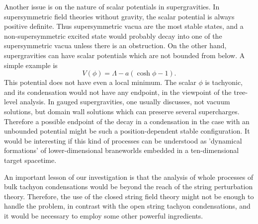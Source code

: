 \documentclass[a4paper,a4paper]{article}
\begin{document}
Another issue is on the nature of scalar potentials in supergravities. 
In supersymmetric field theories without gravity, the scalar potential is always positive definite. 
Thus supersymmetric vacua are the most stable states, and a non-supersymmetric excited state would probably decay 
into one of the supersymmetric vacua unless there is an obstruction. 
On the other hand, supergravities can have scalar potentials which are not bounded from below. 
A simple example is \cite{unbounded}
\begin{equation}
V(\phi) = \Lambda-a(\cosh\phi-1).
\end{equation}
This potential does not have even a local minimum. 
The scalar $\phi$ is tachyonic, and its condensation would not have any endpoint, in the viewpoint of  the 
tree-level analysis. 
In gauged supergravities, one usually discusses, not vacuum solutions, but domain wall solutions which can preserve 
several supercharges. 
Therefore a possible endpoint of the decay in a condensation in the case 
with an unbounded potential might be such a position-dependent 
stable configuration. 
It would be interesting if this kind of processes can be understood as 'dynamical formations' of 
lower-dimensional braneworlds embedded in a ten-dimensional target spacetime. 

An important lesson of our investigation is that the analysis of 
whole processes of bulk tachyon condensations would be beyond 
the reach of the string perturbation theory. 
Therefore, the use of the closed string field theory might not be enough to handle the problem, 
in contrast with the open string tachyon condensations, 
and it would be necessary to employ some other powerful ingredients. 





















\newpage
\end{document}
